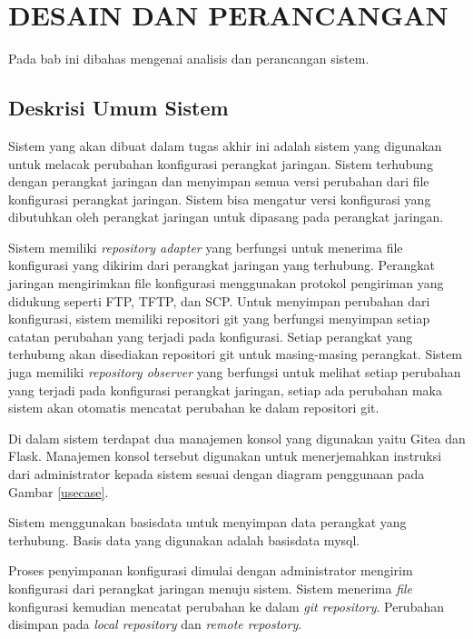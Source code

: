 \chapter{DESAIN DAN PERANCANGAN}
    Pada bab ini dibahas mengenai analisis dan perancangan sistem.
    
    \section{Deskrisi Umum Sistem}
    	Sistem yang akan dibuat dalam tugas akhir ini adalah sistem yang digunakan untuk melacak perubahan konfigurasi perangkat jaringan. Sistem terhubung dengan perangkat jaringan dan menyimpan semua versi perubahan dari file konfigurasi perangkat jaringan. Sistem bisa mengatur versi konfigurasi yang dibutuhkan oleh perangkat jaringan untuk dipasang pada perangkat jaringan.
    	
    	\indent Sistem memiliki \textit{repository adapter} yang berfungsi untuk menerima file konfigurasi yang dikirim dari perangkat jaringan yang terhubung. Perangkat jaringan mengirimkan file konfigurasi menggunakan protokol pengiriman yang didukung seperti FTP, TFTP, dan SCP. Untuk menyimpan perubahan dari konfigurasi, sistem memiliki repositori git yang berfungsi menyimpan setiap catatan perubahan yang terjadi pada konfigurasi. Setiap perangkat yang terhubung akan disediakan repositori git untuk masing-masing perangkat. Sistem juga memiliki \textit{repository observer} yang berfungsi untuk melihat setiap perubahan yang terjadi pada konfigurasi perangkat jaringan, setiap ada perubahan maka sistem akan otomatis mencatat perubahan ke dalam repositori git.
    	
    	\indent Di dalam sistem terdapat dua manajemen konsol yang digunakan yaitu Gitea dan Flask. Manajemen konsol tersebut digunakan untuk menerjemahkan instruksi dari administrator kepada sistem sesuai dengan diagram penggunaan pada Gambar \ref{usecase}.
    	
    	\indent Sistem menggunakan basisdata untuk menyimpan data perangkat yang terhubung. Basis data yang digunakan adalah basisdata mysql.
    	
    	\indent Proses penyimpanan konfigurasi dimulai dengan administrator mengirim konfigurasi dari perangkat jaringan menuju sistem. Sistem menerima \textit{file} konfigurasi kemudian mencatat perubahan ke dalam \textit{git repository}. Perubahan disimpan pada \textit{local repository} dan \textit{remote repostory}.
	
